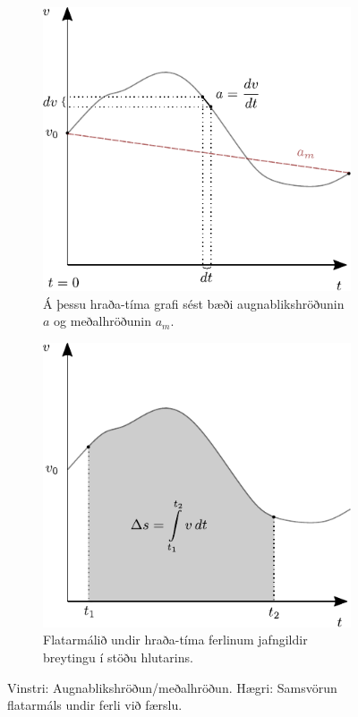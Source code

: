 \begin{figure}[H]
    \centering
\begin{subfigure}[h]{.4\textwidth}
    \centering
    \includegraphics[width=\linewidth]{figures/hradatimagraf-hallatala.pdf}
    \caption{Á þessu hraða-tíma grafi sést bæði augnablikshröðunin $a$ og meðalhröðunin $a_m$.}
    \label{fig:vt-hradi}
\end{subfigure}
\hfill
\begin{subfigure}[h]{.4\textwidth}
    \centering
    \includegraphics[width=\linewidth]{figures/hradatimagraf-flatarmalid.pdf}
    \caption{Flatarmálið undir hraða-tíma ferlinum jafngildir breytingu í stöðu hlutarins.}
    \label{fig:vt-tegur}
\end{subfigure}
\caption{Vinstri: Augnablikshröðun/meðalhröðun. Hægri: Samsvörun flatarmáls undir ferli við færslu.}
\end{figure}

